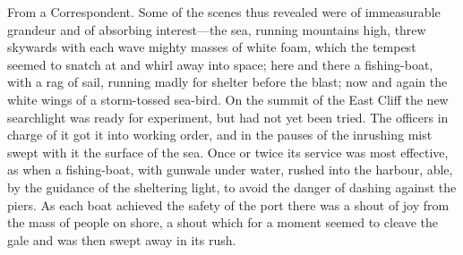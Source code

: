 \begin{newspaper}{}{From a Correspondent.}
Some of the scenes thus revealed were of immeasurable grandeur and of absorbing interest—the sea, running mountains high, threw skywards with each wave mighty masses of white foam, which the tempest seemed to snatch at and whirl away into space; here and there a fishing-boat, with a rag of sail, running madly for shelter before the blast; now and again the white wings of a storm-tossed sea-bird. On the summit of the East Cliff the new searchlight was ready for experiment, but had not yet been tried. The officers in charge of it got it into working order, and in the pauses of the inrushing mist swept with it the surface of the sea. Once or twice its service was most effective, as when a fishing-boat, with gunwale under water, rushed into the harbour, able, by the guidance of the sheltering light, to avoid the danger of dashing against the piers. As each boat achieved the safety of the port there was a shout of joy from the mass of people on shore, a shout which for a moment seemed to cleave the gale and was then swept away in its rush.


\end{newspaper}
